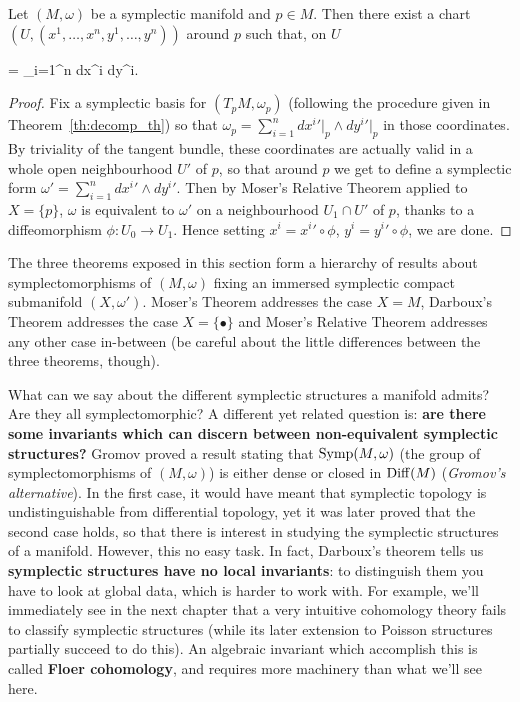 \documentclass[main.tex]{subfiles}
\begin{document}
\begin{theorem}[Darboux]
	Let $(M, \omega)$ be a symplectic manifold and $p \in M$. Then there exist a chart $(U, (x^1, \ldots, x^n, y^1, \ldots, y^n))$ around $p$ such that, on $U$
	\begin{eqalign}
		\omega = \sum_{i=1}^n dx^i \wedge dy^i.
	\end{eqalign}
\end{theorem}
\begin{proof}
	Fix a symplectic basis for $(T_pM, \omega_p)$ (following the procedure given in Theorem~\ref{th:decomp_th}) so that $\omega_p = \sum_{i=1}^n {dx^i}'\vert_p \wedge {dy^i}'\vert_p$ in those coordinates. By triviality of the tangent bundle, these coordinates are actually valid in a whole open neighbourhood $U'$ of $p$, so that around $p$ we get to define a symplectic form $\omega' = \sum_{i=1}^n {dx^i}' \wedge {dy^i}'$. Then by Moser's Relative Theorem applied to $X=\{p\}$, $\omega$ is equivalent to $\omega'$ on a neighbourhood $U_1 \cap U'$ of $p$, thanks to a diffeomorphism $\phi : U_0 \to U_1$. Hence setting $x^i = {x^i}' \circ \phi$, $y^i = {y^i}' \circ \phi$, we are done.
\end{proof}

\begin{remark}
	The three theorems exposed in this section form a hierarchy of results about symplectomorphisms of $(M, \omega)$ fixing an immersed symplectic compact submanifold $(X, \omega')$. Moser's Theorem addresses the case $X=M$, Darboux's Theorem addresses the case $X=\{\bullet\}$ and Moser's Relative Theorem addresses any other case in-between (be careful about the little differences between the three theorems, though).
\end{remark}

\begin{remark}
	What can we say about the different symplectic structures a manifold admits? Are they all symplectomorphic? A different yet related question is: \textbf{are there some invariants which can discern between non-equivalent symplectic structures?} Gromov proved a result stating that $\mathrm{Symp}(M, \omega)$ (the group of symplectomorphisms of $(M, \omega)$) is either dense or closed in $\mathrm{Diff}(M)$ (\emph{Gromov's alternative}). In the first case, it would have meant that symplectic topology is undistinguishable from differential topology, yet it was later proved that the second case holds, so that there is interest in studying the symplectic structures of a manifold. However, this no easy task. In fact, Darboux's theorem tells us \textbf{symplectic structures have no local invariants}: to distinguish them you have to look at global data, which is harder to work with. For example, we'll immediately see in the next chapter that a very intuitive cohomology theory fails to classify symplectic structures (while its later extension to Poisson structures partially succeed to do this). An algebraic invariant which accomplish this is called \textbf{Floer cohomology}, and requires more machinery than what we'll see here.
\end{remark}
\end{document}
